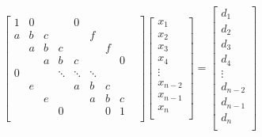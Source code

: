 \documentclass[12pt]{article}
\begin{document}
\[
\begin{bmatrix}
1 & 0 &   &   & 0 &   &    &\\
a & b & c &   &   & f &    &\\
  & a & b & c &   &   & f  &\\
  &   & a & b & c &   &    & 0\\
0 &   &   & \ddots & \ddots & \ddots &  &  \\
  & e &   &   & a & b & c &   &\\
  &   & e &   &   & a & b & c \\
  &   &   & 0 &   &   & 0 & 1 \\
\end{bmatrix}
\begin{bmatrix}
x_1 \\
x_2 \\
x_3 \\
x_4 \\
\vdots \\
x_{n-2} \\
x_{n-1} \\
x_n \\
\end{bmatrix}
=
\begin{bmatrix}
d_1 \\
d_2 \\
d_3 \\
d_4 \\
\vdots \\
d_{n-2} \\
d_{n-1} \\
d_n \\
\end{bmatrix}
\]



\end{document}
